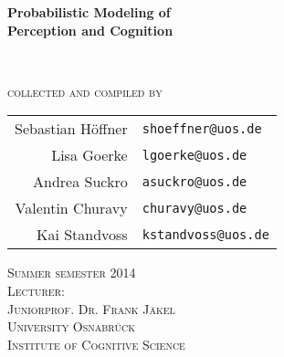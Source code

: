 \documentclass[../main/Notes.tex]{subfiles}
\begin{document}
\begin{center}


\vspace*{2cm}

\Large
\textbf{Probabilistic Modeling of \\Perception and Cognition}\\

\vspace{1cm}

\normalsize
\textbf{
\iftoggle{solutions}{Lecture Notes and Exercise Solutions}{Lecture Notes}
}\\

\vspace{3cm}

\textsc{collected and compiled by}\\
\vspace{.7em}
\begin{tabular}{rl}
Sebastian Höffner & \texttt{\footnotesize shoeffner@uos.de}\\
Lisa Goerke & \texttt{\footnotesize lgoerke@uos.de}\\
Andrea Suckro & \texttt{\footnotesize asuckro@uos.de}\\
Valentin Churavy & \texttt{\footnotesize churavy@uos.de}\\
Kai Standvoss & \texttt{\footnotesize kstandvoss@uos.de}\\
\end{tabular}

\vspace{6cm}

\textsc{Summer semester 2014}\\
\vspace{1cm}
\textsc{Lecturer:\\
Juniorprof. Dr. Frank Jäkel}\\
\vspace{0.5cm}
\textsc{University Osnabrück\\
Institute of Cognitive Science}\\


\end{center}
\end{document}
